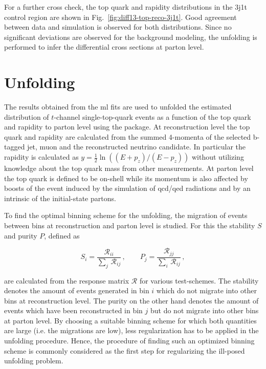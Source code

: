For a further cross check, the top quark \pt and rapidity distributions in the 3j1t \ttbar control region are shown in Fig.~\ref{fig:diff13-top-reco-3j1t}. Good agreement between data and simulation is observed for both distributions. Since no significant deviations are observed for the background modeling, the unfolding is performed to infer the differential cross sections at parton level.


\section{Unfolding}
\label{sec:diff13-unfolding}

The results obtained from the \gls{ml} fits are used to unfolded the estimated distribution of $t$-channel single-top-quark events as a function of the top quark \pt and rapidity to parton level using the \TUNFOLD package. At reconstruction level the top quark \pt and rapidity are calculated from the summed 4-momenta of the selected b-tagged jet, muon and the reconstructed neutrino candidate. In particular the rapidity is calculated as $y=\frac{1}{2}\ln((E+p_{z})/(E-p_{z}))$ without utilizing knowledge about the top quark mass from other measurements. At parton level the top quark is defined to be on-shell while its momentum is also affected by boosts of the event induced by the simulation of \gls{qcd}/\gls{qed} radiations and by an intrinsic \kt of the initial-state partons. 

To find the optimal binning scheme for the unfolding, the migration of events between bins at reconstruction and parton level is studied. For this the stability $S$ and purity $P$, defined as 

\begin{equation}
S_{i}=\frac{\mathcal{R}_{ii}}{\sum\limits_{j}\,\mathcal{R}_{ij}}\,,\qquad P_{j}=\frac{\mathcal{R}_{jj}}{\sum\limits_{i}\,\mathcal{R}_{ij}}\,,
\end{equation}

are calculated from the response matrix $\mathcal{R}$ for various test-schemes. The stability denotes the amount of events generated in bin $i$ which do not migrate into other bins at reconstruction level. The purity on the other hand denotes the amount of events which have been reconstructed in bin $j$ but do not migrate into other bins at parton level. By choosing a suitable binning scheme for which both quantities are large (i.e. the migrations are low), less regularization has to be applied in the unfolding procedure. Hence, the procedure of finding such an optimized binning scheme is commonly considered as the first step for regularizing the ill-posed unfolding problem.

